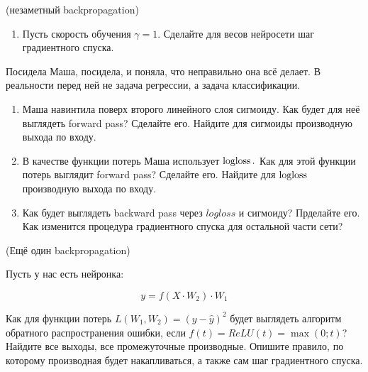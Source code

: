 \begin{problem}{(незаметный backpropagation)}
\begin{enumerate}
		\item Пусть скорость обучения $\gamma = 1$.  Сделайте для весов нейросети шаг градиентного спуска. 
	\end{enumerate}

	Посидела Маша, посидела, и поняла, что неправильно она всё делает. В реальности перед ней не задача регрессии, а задача классификации. 
	
	\begin{enumerate}	
		\item Маша навинтила поверх второго линейного слоя сигмоиду. Как будет для неё выглядеть forward pass? Сделайте его. Найдите для сигмоиды производную выхода по входу.
		
		\item В качестве функции потерь Маша использует $\operatorname{logloss}.$ Как для этой функции потерь выглядит forward pass? Сделайте его. Найдите для $\operatorname{logloss}$ производную выхода по входу. 
		
		\item Как будет выглядеть backward pass через $logloss$ и сигмоиду? Прделайте его. Как изменится процедура градиентного спуска для остальной части сети? 
	\end{enumerate}
\end{problem} 


\begin{problem}{(Ещё один backpropagation)}


	Пусть у нас есть нейронка: 
	
	$$ 
	y = f(X \cdot W_2 ) \cdot W_1 
	$$
	
	Как для функции потерь $L(W_1, W_2) = (y - \hat y)^2$ будет выглядеть алгоритм обратного распространения ошибки, если $f(t) = ReLU(t) =  \max(0; t)$? Найдите все выходы, все промежуточные производные.  Опишите правило, по которому производная будет накапливаться, а также сам шаг градиентного спуска. 
\end{problem} 

